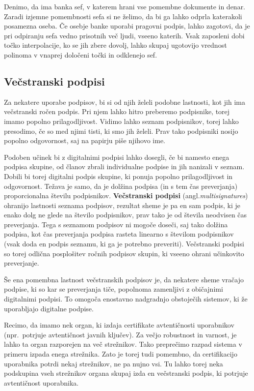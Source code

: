 \documentclass[isrm2, tisk]{fmfdelo}
\begin{document}
\begin{primer}
    Denimo, da ima banka sef, v katerem hrani vse pomembne dokumente in denar. Zaradi
    izjemne pomembnosti sefa si ne želimo, da bi ga lahko odprla katerakoli posamezna oseba. Če 
    osebje banke uporabi pragovni podpis, lahko zagotovi, da je pri odpiranju sefa vedno prisotnih
    več ljudi, vseeno katerih. Vsak zaposleni dobi točko interpolacije, ko se jih zbere dovolj,
    lahko skupaj ugotovijo vrednost polinoma v vnaprej določeni točki in odklenejo sef.
\end{primer}

\subsection{Večstranski podpisi}
\label{sec:multisig}
Za nekatere uporabe podpisov, bi si od njih želeli podobne lastnosti, kot jih ima večstranski ročen podpis. 
Pri njem lahko hitro preberemo podpisnike, torej imamo popolno prilagodljivost. Vidimo lahko seznam 
podpisnikov, torej lahko presodimo, če so med njimi tisti, ki smo jih želeli. Prav tako podpisniki nosijo 
popolno odgovornost, saj na papirju piše njihovo ime. 

Podoben učinek bi z digitalnimi podpisi lahko dosegli, če bi namesto enega podpisa skupine, od članov 
zbrali individualne podpise in jih nanizali v seznam. Dobili bi torej digitalni podpis skupine, ki 
ponuja popolno prilagodljivost in odgovornost. Težava je samo, da je dolžina podpisa (in s tem čas 
preverjanja) proporcionalna številu podpisnikov. \textbf{Večstranski podpisi} (angl.\textit{multisignatures})
ohranijo lastnosti seznama podpisov, rezultat sheme je pa en sam podpis, ki je enako dolg ne glede 
na število podpisnikov, prav tako je od števila neodvisen čas preverjanja. Tega s seznamom podpisov 
ni mogoče doseči, saj tako dolžina podpisa, kot čas preverjanja podpisa rasteta linearno s številom 
podpisnikov (vsak doda en podpis seznamu, ki ga je potrebno preveriti). Večstranski podpisi so torej 
odlična posplošitev ročnih podpisov skupin, ki vseeno ohrani učinkovito preverjanje.

Še ena pomembna lastnost večstranskih podpisov je, da nekatere sheme vračajo podpise, ki so kar se
preverjanja tiče, popolnoma zamenljivi z običajnimi digitalnimi podpisi. To omogoča enostavno
nadgradnjo obstoječih sistemov, ki že uporabljajo digitalne podpise.

\begin{primer}
    Recimo, da imamo nek organ, ki izdaja certifikate avtentičnosti uporabnikov (npr.\ potrjuje 
    avtentičnost javnih ključev). Za večjo robustnost in varnost, je lahko ta organ razporejen 
    na več strežnikov. Tako preprečimo razpad sistema v primeru izpada enega strežnika. Zato je 
    torej tudi pomembno, da certifikacijo uporabnika potrdi nekaj strežnikov, ne pa nujno vsi. 
    Tu lahko torej neka podskupina vseh strežnikov organa skupaj izda en večstranski podpis, ki 
    potrjuje avtentičnost uporabnika.
\end{primer}
\end{document}
